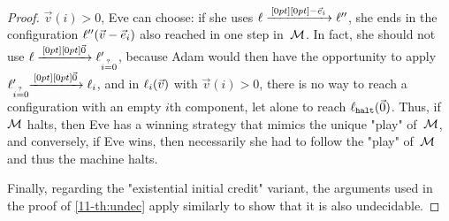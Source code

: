 \begin{proof}
  $\vec v(i)>0$, Eve can choose: if she uses
  $\ell\xrightarrow{\,[0pt][0pt]{\scriptsize{-\vec e_i}}\,}\ell''$, she ends in the configuration
  $\ell''(\vec v-\vec e_i)$ also reached in one step in~$\mathcal M$.  In
  fact, she should not use $\ell\xrightarrow{\,[0pt][0pt]{\scriptsize{\vec 0}}\,}\ell'_{i\stackrel{\!\,\!\,{{\textrm{?}}}}{=}0}$,
  because Adam would then have the opportunity to apply
  $\ell'_{i\stackrel{\!\,\!\,{{\textrm{?}}}}{=}0}\!\!\xrightarrow{\,[0pt][0pt]{\scriptsize{\vec 0}}\,}\ell_{i}$, and in
  $\ell_{i}(\vec v)$ with $\vec v(i)>0$, there is no way to
  reach a configuration with an empty $i$th component, let alone to
  reach $\ell_\mathtt{halt}(\vec 0)$.  Thus, if $\mathcal M$ halts, then Eve 
  has a winning strategy that mimics the unique "play"
  of~$\mathcal M$, and conversely, if Eve wins, then necessarily she had to
  follow the "play" of~$\mathcal M$ and thus the machine halts.

  \medskip Finally, regarding the "existential initial credit"
  variant, the arguments used in the proof of \cref{11-th:undec} apply
  similarly to show that it is also undecidable.
\end{proof}


